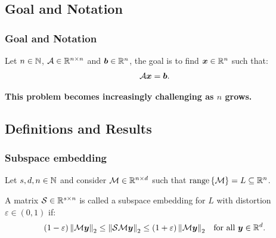 \subsection{Goal and Notation}

\begin{frame}
    \frametitle{Goal and Notation}

    Let $n \in \mathbb{N}$,  $\mathcal{A} \in \mathbb{R}^{n \times n}$ and $\bm{b} \in \mathbb{R}^{n}$, the goal is to find $\bm{x} \in \mathbb{R}^{n}$ such that:
    \begin{align}
        \mathcal{A} \bm{x} = \bm{b}. \label{eq:system}
    \end{align}

    \textbf{This problem becomes increasingly challenging as $n$ grows.}

\end{frame}

\subsection{Definitions and Results}

\begin{frame}
    \frametitle{Subspace embedding}

    \begin{definition} \label{def:embedding}
        Let $s, d, n \in \mathbb{N}$ and consider $\mathcal{M} \in \mathbb{R}^{n \times d}$ such that $\operatorname*{range}\left\{\mathcal{M}\right\} = L \subseteq \mathbb{R}^{n}$. 
        
        A matrix $\mathcal{S} \in \mathbb{R}^{s \times n}$ is called a subspace embedding for $L$ with distortion $\varepsilon \in \left(0, 1\right)$ if:
        \begin{align}
            \left( 1 - \varepsilon \right) \left\lVert \mathcal{M} \bm{y} \right\rVert_2 \leq \left\lVert \mathcal{S} \mathcal{M} \bm{y} \right\rVert_2 &\leq \left( 1 + \varepsilon \right) \left\lVert \mathcal{M} \bm{y} \right\rVert_2 &\text{for all } \bm{y} \in \mathbb{R}^{d}. \label{eq:embedding}
        \end{align}
    \end{definition}
\end{frame}

